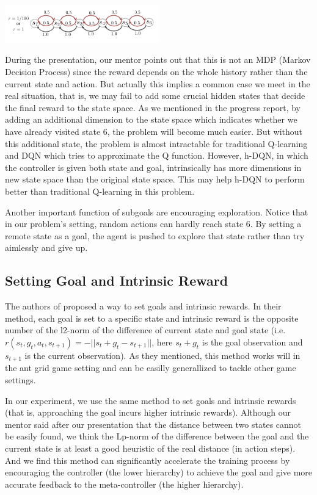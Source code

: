 \documentclass{article}
\begin{document}
\begin{spacing}{1.1}
    \begin{center}
        \includegraphics[width = 0.5\textwidth]{game.png}
    \end{center}

    During the presentation, our mentor points out that this is not an MDP (Markov Decision Process) since the reward depends on the whole history rather than the current state and action. But actually this implies a common case we meet in the real situation, that is, we may fail to add some crucial hidden states that decide the final reward to the state space. As we mentioned in the progress report, by adding an additional dimension to the state space which indicates whether we have already visited state 6, the problem will become much easier. But without this additional state, the problem is almost intractable for traditional Q-learning and DQN which tries to approximate the Q function. However, h-DQN, in which the controller is given both state and goal, intrinsically has more dimensions in new state space than the original state space. This may help h-DQN to perform better than traditional Q-learning in this problem.

    Another important function of subgoals are encouraging exploration. Notice that in our problem's setting, random actions can hardly reach state 6. By setting a remote state as a goal, the agent is pushed to explore that state rather than try aimlessly and give up.

    \subsection{Setting Goal and Intrinsic Reward}
    The authors of \cite{AI-18} proposed a way to set goals and intrinsic rewards. In their method, each goal is set to a specific state and intrinsic reward is the opposite number of the l2-norm of the difference of current state and goal state (i.e. $r(s_t, g_t, a_t, s_{t+1}) = -||s_t + g_t - s_{t+1}||$, here $s_t + g_t$ is the goal observation and $s_{t+1}$ is the current observation). As they mentioned, this method works will in the ant grid game setting and can be easilly generallized to tackle other game settings.

    In our experiment, we use the same method to set goals and intrinsic rewards (that is, approaching the goal incurs higher intrinsic rewards). Although our mentor said after our presentation that the distance between two states cannot be easily found, we think the Lp-norm of the difference between the goal and the current state is at least a good heuristic of the real distance (in action steps). And we find this method can significantly accelerate the training process by encouraging the controller (the lower hierarchy) to achieve the goal and give more accurate feedback to the meta-controller (the higher hierarchy).


\end{spacing}
\end{document}
